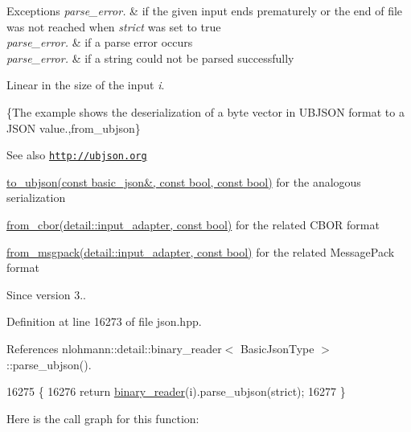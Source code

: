 \begin{DoxyExceptions}{Exceptions}
{\em parse\+\_\+error.} & if the given input ends prematurely or the end of file was not reached when {\itshape strict} was set to true \\
\hline
{\em parse\+\_\+error.} & if a parse error occurs \\
\hline
{\em parse\+\_\+error.} & if a string could not be parsed successfully\\
\hline
\end{DoxyExceptions}
Linear in the size of the input {\itshape i}.

\{The example shows the deserialization of a byte vector in U\+B\+J\+S\+ON format to a J\+S\+ON value.,from\+\_\+ubjson\}

\begin{DoxySeeAlso}{See also}
\href{http://ubjson.org}{\tt http\+://ubjson.\+org} 

\hyperlink{classnlohmann_1_1basic__json_ae1ece6c2059114eac10873f13ef19185}{to\+\_\+ubjson(const basic\+\_\+json\&, const bool, const bool)} for the analogous serialization 

\hyperlink{classnlohmann_1_1basic__json_aa9be366b887378bb10c0f1ab510c2f0c}{from\+\_\+cbor(detail\+::input\+\_\+adapter, const bool)} for the related C\+B\+OR format 

\hyperlink{classnlohmann_1_1basic__json_aab804530006701b136ef9a0bc961434b}{from\+\_\+msgpack(detail\+::input\+\_\+adapter, const bool)} for the related Message\+Pack format
\end{DoxySeeAlso}
\begin{DoxySince}{Since}
version 3.. 
\end{DoxySince}


Definition at line 16273 of file json.\+hpp.



References nlohmann\+::detail\+::binary\+\_\+reader$<$ Basic\+Json\+Type $>$\+::parse\+\_\+ubjson().


\begin{DoxyCode}
16275     \{
16276         \textcolor{keywordflow}{return} \hyperlink{classnlohmann_1_1basic__json_a7e06ed27ff517575ccb23fc23fca2b8f}{binary\_reader}(i).parse\_ubjson(strict);
16277     \}
\end{DoxyCode}
Here is the call graph for this function\+:
\mbox{\label{classnlohmann_1_1basic__json_af0f553f2efd43198ee463ba207fe7f39}} 
